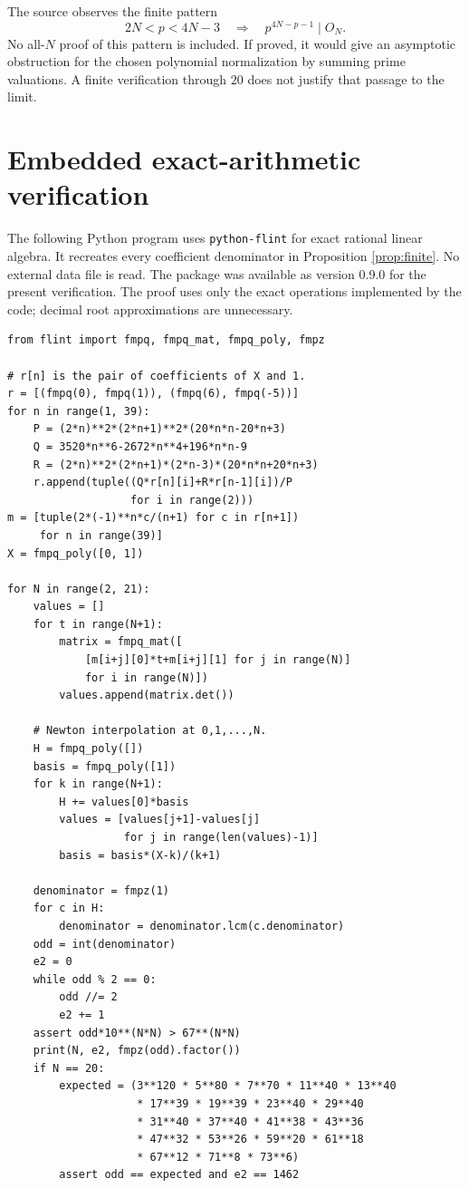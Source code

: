 \documentclass[11pt,a4paper]{article}
\theoremstyle{definition}\newtheorem{definition}[theorem]{Definition}
\theoremstyle{remark}\newtheorem{remark}[theorem]{Remark}
\begin{document}
The source observes the finite pattern
\[
 2N<p<4N-3\quad\Longrightarrow\quad p^{4N-p-1}\mid O_N.
\]
No all-$N$ proof of this pattern is included. If proved, it would give an asymptotic obstruction for the chosen polynomial normalization by summing prime valuations. A finite verification through $20$ does not justify that passage to the limit.

\section{Embedded exact-arithmetic verification}\label{sec:code}
The following Python program uses \texttt{python-flint} for exact rational linear algebra. It recreates every coefficient denominator in Proposition \ref{prop:finite}. No external data file is read. The package was available as version 0.9.0 for the present verification. The proof uses only the exact operations implemented by the code; decimal root approximations are unnecessary.

\begingroup\small
\begin{verbatim}
from flint import fmpq, fmpq_mat, fmpq_poly, fmpz

# r[n] is the pair of coefficients of X and 1.
r = [(fmpq(0), fmpq(1)), (fmpq(6), fmpq(-5))]
for n in range(1, 39):
    P = (2*n)**2*(2*n+1)**2*(20*n*n-20*n+3)
    Q = 3520*n**6-2672*n**4+196*n*n-9
    R = (2*n)**2*(2*n+1)*(2*n-3)*(20*n*n+20*n+3)
    r.append(tuple((Q*r[n][i]+R*r[n-1][i])/P
                   for i in range(2)))
m = [tuple(2*(-1)**n*c/(n+1) for c in r[n+1])
     for n in range(39)]
X = fmpq_poly([0, 1])

for N in range(2, 21):
    values = []
    for t in range(N+1):
        matrix = fmpq_mat([
            [m[i+j][0]*t+m[i+j][1] for j in range(N)]
            for i in range(N)])
        values.append(matrix.det())

    # Newton interpolation at 0,1,...,N.
    H = fmpq_poly([])
    basis = fmpq_poly([1])
    for k in range(N+1):
        H += values[0]*basis
        values = [values[j+1]-values[j]
                  for j in range(len(values)-1)]
        basis = basis*(X-k)/(k+1)

    denominator = fmpz(1)
    for c in H:
        denominator = denominator.lcm(c.denominator)
    odd = int(denominator)
    e2 = 0
    while odd % 2 == 0:
        odd //= 2
        e2 += 1
    assert odd*10**(N*N) > 67**(N*N)
    print(N, e2, fmpz(odd).factor())
    if N == 20:
        expected = (3**120 * 5**80 * 7**70 * 11**40 * 13**40
                    * 17**39 * 19**39 * 23**40 * 29**40
                    * 31**40 * 37**40 * 41**38 * 43**36
                    * 47**32 * 53**26 * 59**20 * 61**18
                    * 67**12 * 71**8 * 73**6)
        assert odd == expected and e2 == 1462
\end{verbatim}
\endgroup
\end{document}
